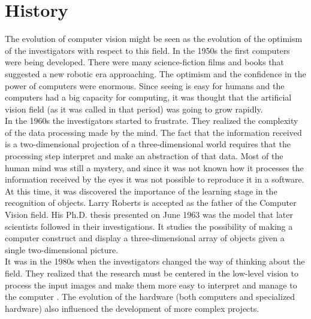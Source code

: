 \section{History}

The evolution of computer vision might be seen as the evolution of the optimism of the investigators with respect to this field. 
In the 1950s the first computers were being developed. There were many science-fiction films and books that suggested a new robotic era approaching. The optimism and the confidence in the power of computers were enormous. 
Since seeing is easy for humans and the computers had a big capacity for computing, it was thought that the artificial vision field (as it was called in that period) was going to grow rapidly. 
\\

In the 1960s the investigators started to frustrate. 
They realized the complexity of the data processing made by the mind. 
The fact that the information received is a two-dimensional projection of a three-dimensional world requires that the processing step interpret and make an abstraction of that data.
Most of the human mind was still a mystery, and since it was not known how it processes the information received by the eyes it was not possible to reproduce it in a software. 
At this time, it was discovered the importance of the learning stage in the recognition of objects. 
Larry Roberts is accepted as the father of the Computer Vision field\cite{Huang}.
His Ph.D. thesis presented on June 1963\cite{Roberts1963} was the model that later scientists followed in their investigations. 
It studies the possibility of making a computer construct and display a three-dimensional array of objects given a single two-dimensional picture. 
\\

 It was in the 1980s when the investigators changed the way of thinking about the field.
They realized that the research must be centered in the low-level vision to process the input images and make them more easy to interpret and manage to the computer \cite{Huang}. 
The evolution of the hardware (both computers and specialized hardware) also influenced the development of more complex projects. 
\\

